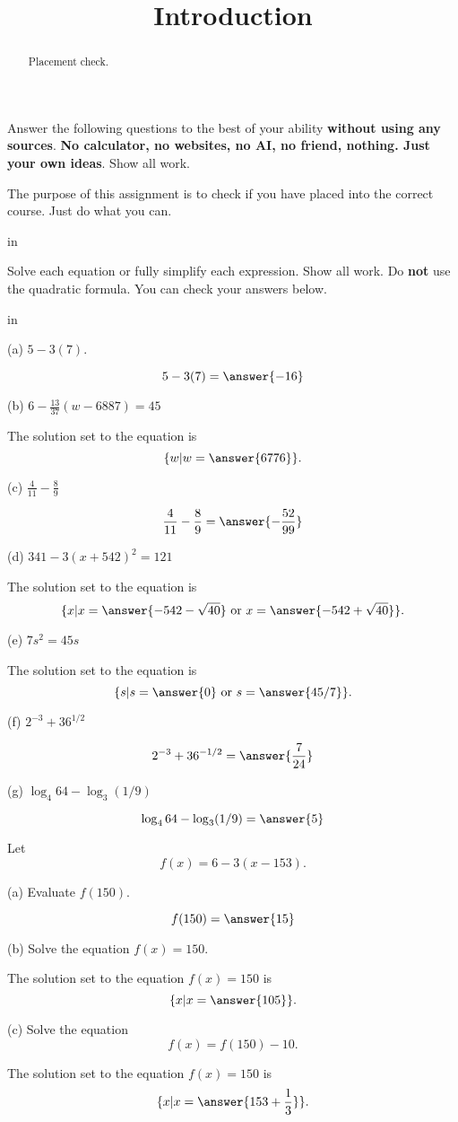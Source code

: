 \documentclass{ximera}
\title{Introduction}
\newcommand{\pskip}{\vskip 0.1 in}
\begin{document}
\begin{abstract}
Placement check. 
\end{abstract}
\maketitle


Answer the following questions to the best of your ability {\bf without using any sources}. {\bf No calculator, no websites, no AI, no friend, nothing. Just your own ideas}. Show all work. %

The purpose of this assignment is to check if you have placed into the correct course. Just do what you can.

\pskip

\begin{question}  \label{Q9df934gmmn}
Solve each equation or fully simplify each expression. Show all work. Do {\bf not} use the quadratic formula. You can check your answers below.

\pskip

(a) $ 5 - 3(7)$.  

\[
       5 - 3(7) =  \answer{-16}
\]

(b) $6 - \frac{13}{37} \left(  w - 6887 \right) = 45$

The solution set to the equation is
\[
    \{w | w= \answer{6776} \} .
\]

(c) $\frac{4}{11} - \frac{8}{9}$

\[
    \frac{4}{11} - \frac{8}{9} = \answer{-\frac{52}{99}} 
\]

(d) $341 - 3 (x+542)^2 =121$

The solution set to the equation is
\[
       \{x | x= \answer{-542 - \sqrt{40}} \text{ or } x= \answer{-542 + \sqrt{40} } \}.
\]

(e) $7s^2 = 45s $

The solution set to the equation is
\[
       \{s | s= \answer{0} \text{ or } s = \answer{45/7} \}.
\]

(f) $2^{-3} + 36^{1/2}$

\[
     2^{-3} + 36^{-1/2} = \answer{\frac{7}{24}}
\]

(g) $\log_4 64 - \log_3 (1/9)$

\[
   \log_4 64 - \log_3 (1/9) = \answer{5}
\]


\end{question}

\begin{question}  \label{Q:9sdf85r3}
Let 
\[
   f(x) = 6 - 3(x-153) .
\]

(a) Evaluate $f(150)$.

\[
   f(150)=\answer{15}
\]

(b) Solve the equation $f(x)=150$.

The solution set to the equation $f(x)=150$ is
\[
  \{  x | x = \answer{105}  \}.
\]


(c) Solve the equation
\[
      f(x) = f(150)-10 .
\]

The solution set to the equation $f(x)=150$ is
\[
  \{  x | x = \answer{153 + \frac{1}{3}}  \}.
\]

\end{question}  
\end{document}
